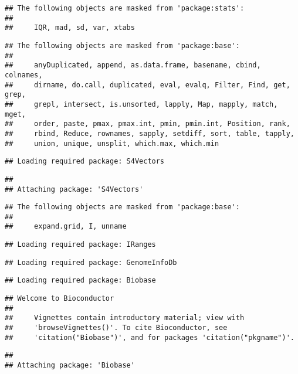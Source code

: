 \documentclass[
  oneside]{book}
\begin{document}
\begin{verbatim}
## The following objects are masked from 'package:stats':
## 
##     IQR, mad, sd, var, xtabs
\end{verbatim}

\begin{verbatim}
## The following objects are masked from 'package:base':
## 
##     anyDuplicated, append, as.data.frame, basename, cbind, colnames,
##     dirname, do.call, duplicated, eval, evalq, Filter, Find, get, grep,
##     grepl, intersect, is.unsorted, lapply, Map, mapply, match, mget,
##     order, paste, pmax, pmax.int, pmin, pmin.int, Position, rank,
##     rbind, Reduce, rownames, sapply, setdiff, sort, table, tapply,
##     union, unique, unsplit, which.max, which.min
\end{verbatim}

\begin{verbatim}
## Loading required package: S4Vectors
\end{verbatim}

\begin{verbatim}
## 
## Attaching package: 'S4Vectors'
\end{verbatim}

\begin{verbatim}
## The following objects are masked from 'package:base':
## 
##     expand.grid, I, unname
\end{verbatim}

\begin{verbatim}
## Loading required package: IRanges
\end{verbatim}

\begin{verbatim}
## Loading required package: GenomeInfoDb
\end{verbatim}

\begin{verbatim}
## Loading required package: Biobase
\end{verbatim}

\begin{verbatim}
## Welcome to Bioconductor
## 
##     Vignettes contain introductory material; view with
##     'browseVignettes()'. To cite Bioconductor, see
##     'citation("Biobase")', and for packages 'citation("pkgname")'.
\end{verbatim}

\begin{verbatim}
## 
## Attaching package: 'Biobase'
\end{verbatim}
\end{document}
